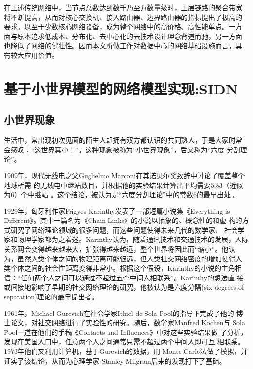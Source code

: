 \documentclass[oneside, phd]{njuthesis}
\begin{document}
在上述传统网络中，当节点总数达到数千乃至万数量级时，上层链路的聚合带宽
将不断提高，从而对核心交换机、接入路由器、边界路由器的指标提出了极高的
要求。以至于少数核心网络设备，成为整个网络中的高价格、高性能单点。一方
面与原本追求低成本、分布化、去中心化的云技术设计理念背道而驰，另一方面
也降低了网络的健壮性。因而本文所做工作对数据中心的网络基础设施而言，具
有较大应用价值。

\chapter{基于小世界模型的网络模型实现:SIDN}\label{chapter_smallworld}

\section{小世界现象}

生活中，常出现初次见面的陌生人却拥有双方都认识的共同熟人，于是大家时常
会感叹：“这世界真小！”。这种现象被称为``小世界现象''，后又称为``六度
分割理论''。

1909年，现代无线电之父Guglielmo Marconi在其诺贝尔奖致辞中讨论了覆盖整个地球所需
的无线电中继站数目，并根据他的实验结果计算出平均需要$5.83$（近似为$6$）个中继站
\cite{marconi1909nobel}。这个结论，被认为是``六度分割理论''中的常数$6$的最早出处
\cite{barabasi2003linked}。

1929年，匈牙利作家Frigyes Karinthy发表了一部短篇小说集《Everything is
  Different》。其中一篇名为《Chain-Links》的小说以抽象的、概念性的和虚
构的方式研究了网络理论领域的很多问题，而这些问题使得未来几代的数学家、
社会学家和物理学家都为之着迷\cite{newman2006structure,
  barabasi2003linked}。Karinthy认为，随着通讯技术和交通技术的发展，人际
关系网会变得越来越来大，扩张得越来越远，整个世界将因此而``缩小''。他认
为，虽然人类个体之间的物理距离可能很远，但人类社交网络密度的增加使得人
类个体之间的社会性距离变得非常小。根据这个假设，Karinthy的小说的主角相
信：``任何两个人之间可以通过不超过五个中间人相联系''。Karinthy的想法直
接或间接地影响了早期的社交网络理论的研究，他被认为是六度分隔(six
degrees of separation)理论的最早提出者\cite{barabasi2003linked}。

1961年，Michael Gurevich在社会学家Ithiel de Sola Pool的指导下完成了他的
博士论文，对社交网络进行了实验性的研究。随后，数学家Manfred Kochen与
Sola Pool一道在他们的手稿《Contacts and Influences》中对这些实验结果做
了分析，发现在美国人口中，任意两个人之间通常只需不超过两个中间人即可互
相联系\cite{pool1978}。1973年他们又利用计算机，基于Gurevich的数据，用
Monte Carlo法做了模拟，并证实了该结论\cite{pool1978}，从而为心理学家
Stanley Milgram后来的发现打下了基础。
\end{document}
